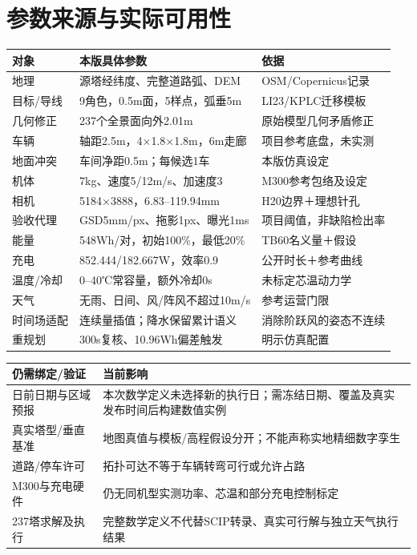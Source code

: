 \section{参数来源与实际可用性}
\begin{center}\small
\begin{tabular}{p{.20\linewidth}p{.45\linewidth}p{.25\linewidth}}\toprule
对象 & 本版具体参数 & 依据\\\midrule
地理 & 源塔经纬度、完整道路弧、DEM & OSM/Copernicus记录\\
目标/导线 & 9角色，0.5m面，5样点，弧垂5m & LI23/KPLC迁移模板\\
几何修正 & 237个全景面向外2.01m & 原始模型几何矛盾修正\\
车辆 & 轴距2.5m，4×1.8×1.8m，6m走廊 & 项目参考底盘，未实测\\
地面冲突 & 车间净距0.5m；每候选1车 & 本版仿真设定\\
机体 & 7kg、速度5/12m/s、加速度3 & M300参考包络及设定\\
相机 & 5184×3888，6.83--119.94mm & H20边界＋理想针孔\\
验收代理 & GSD5mm/px、拖影1px、曝光1ms & 项目阈值，非缺陷检出率\\
能量 & 548Wh/对，初始100\%，最低20\% & TB60名义量＋假设\\
充电 & 852.444/182.667W，效率0.9 & 公开时长＋参考曲线\\
温度/冷却 & 0--40℃常容量，额外冷却0s & 未标定芯温动力学\\
天气 & 无雨、日间、风/阵风不超过10m/s & 参考运营门限\\
时间场适配 & 连续量插值；降水保留累计语义 & 消除阶跃风的姿态不连续\\
重规划 & 300s复核、10.96Wh偏差触发 & 明示仿真配置\\\bottomrule
\end{tabular}\end{center}
\begin{center}\small
\begin{tabular}{p{.29\linewidth}p{.61\linewidth}}\toprule
仍需绑定/验证 & 当前影响\\\midrule
日前日期与区域预报 & 本次数学定义未选择新的执行日；需冻结日期、覆盖及真实发布时间后构建数值实例\\
真实塔型/垂直基准 & 地图真值与模板/高程假设分开；不能声称实地精细数字孪生\\
道路/停车许可 & 拓扑可达不等于车辆转弯可行或允许占路\\
M300与充电硬件 & 仍无同机型实测功率、芯温和部分充电控制标定\\
237塔求解及执行 & 完整数学定义不代替SCIP转录、真实可行解与独立天气执行结果\\\bottomrule
\end{tabular}\end{center}
\clearpage

